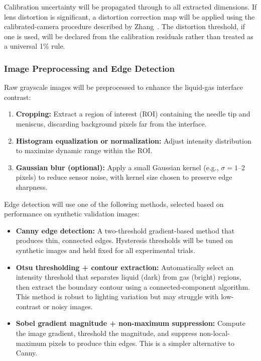 Calibration uncertainty will be propagated through to all extracted dimensions. If lens distortion is significant, a distortion correction map will be applied using the calibrated-camera procedure described by Zhang~\cite{zhang2000calibration}. The distortion threshold, if one is used, will be declared from the calibration residuals rather than treated as a universal 1\% rule.

\subsubsection{Image Preprocessing and Edge Detection}

Raw grayscale images will be preprocessed to enhance the liquid-gas interface contrast:
\begin{enumerate}
    \item \textbf{Cropping:} Extract a region of interest (ROI) containing the needle tip and meniscus, discarding background pixels far from the interface.
    \item \textbf{Histogram equalization or normalization:} Adjust intensity distribution to maximize dynamic range within the ROI.
    \item \textbf{Gaussian blur (optional):} Apply a small Gaussian kernel (e.g., $\sigma = 1$--2 pixels) to reduce sensor noise, with kernel size chosen to preserve edge sharpness.
\end{enumerate}

Edge detection will use one of the following methods, selected based on performance on synthetic validation images:
\begin{itemize}
    \item \textbf{Canny edge detection:} A two-threshold gradient-based method that produces thin, connected edges. Hysteresis thresholds will be tuned on synthetic images and held fixed for all experimental trials.
    \item \textbf{Otsu thresholding + contour extraction:} Automatically select an intensity threshold that separates liquid (dark) from gas (bright) regions, then extract the boundary contour using a connected-component algorithm. This method is robust to lighting variation but may struggle with low-contrast or noisy images.
    \item \textbf{Sobel gradient magnitude + non-maximum suppression:} Compute the image gradient, threshold the magnitude, and suppress non-local-maximum pixels to produce thin edges. This is a simpler alternative to Canny.
\end{itemize}

